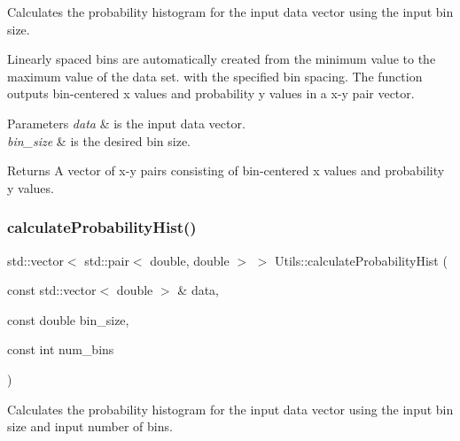 Calculates the probability histogram for the input data vector using the input bin size. 

Linearly spaced bins are automatically created from the minimum value to the maximum value of the data set. with the specified bin spacing. The function outputs bin-\/centered x values and probability y values in a x-\/y pair vector. 
\begin{DoxyParams}{Parameters}
{\em data} & is the input data vector. \\
\hline
{\em bin\+\_\+size} & is the desired bin size. \\
\hline
\end{DoxyParams}
\begin{DoxyReturn}{Returns}
A vector of x-\/y pairs consisting of bin-\/centered x values and probability y values. 
\end{DoxyReturn}
\mbox{\label{namespace_utils_a08553f36886a36456e8111585029e467}} 
\subsubsection{\texorpdfstring{calculate\+Probability\+Hist()}{calculateProbabilityHist()}\hspace{0.1cm}{\footnotesize\ttfamily [3/3]}}
{\footnotesize\ttfamily std\+::vector$<$ std\+::pair$<$ double, double $>$ $>$ Utils\+::calculate\+Probability\+Hist (\begin{DoxyParamCaption}\item[{const std\+::vector$<$ double $>$ \&}]{data,  }\item[{const double}]{bin\+\_\+size,  }\item[{const int}]{num\+\_\+bins }\end{DoxyParamCaption})}



Calculates the probability histogram for the input data vector using the input bin size and input number of bins. 

